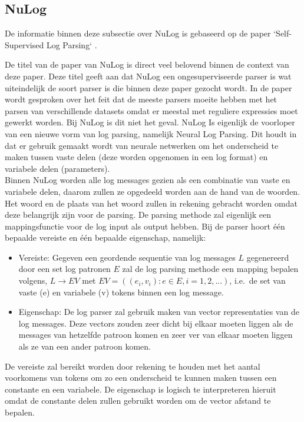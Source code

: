 \subsection{NuLog}
De informatie binnen deze subsectie over NuLog is gebaseerd op de paper `Self-Supervised Log Parsing` \autocite{SSLP2020}.

De titel van de paper van NuLog is direct veel belovend binnen de context van deze paper. Deze titel geeft aan dat NuLog een ongesuperviseerde parser is wat uiteindelijk de soort parser is die binnen deze paper gezocht wordt. In de paper wordt gesproken over het feit dat de meeste parsers moeite hebben met het parsen van verschillende datasets omdat er meestal met reguliere expressies moet gewerkt worden. Bij NuLog is dit niet het geval. NuLog Is eigenlijk de voorloper van een nieuwe vorm van log parsing, namelijk Neural Log Parsing. Dit houdt in dat er gebruik gemaakt wordt van neurale netwerken om het onderscheid te maken tussen vaste delen (deze worden opgenomen in een log format) en variabele delen (parameters).\\

Binnen NuLog worden alle log messages gezien als een combinatie van vaste en variabele delen, daarom zullen ze opgedeeld worden aan de hand van de woorden. Het woord en de plaats van het woord zullen in rekening gebracht worden omdat deze belangrijk zijn voor de parsing. De parsing methode zal eigenlijk een mappingsfunctie voor de log input als output hebben. Bij de parser hoort één bepaalde vereiste en één bepaalde eigenschap, namelijk:
\begin{itemize}
    \item Vereiste: Gegeven een geordende sequentie van log messages $L$ gegenereerd door een set log patronen $E$ zal de log parsing methode een mapping bepalen volgens, $L \longrightarrow EV$ met $EV = ((e_{i}, v_{i}): e \in E, i = 1, 2, ...)$, i.e.\ de set van vaste (e) en variabele (v) tokens binnen een log message. 
    \item Eigenschap: De log parser zal gebruik maken van vector representaties van de log messages. Deze vectors zouden zeer dicht bij elkaar moeten liggen als de messages van hetzelfde patroon komen en zeer ver van elkaar moeten liggen als ze van een ander patroon komen. 
\end{itemize}

De vereiste zal bereikt worden door rekening te houden met het aantal voorkomens van tokens om zo een onderscheid te kunnen maken tussen een constante en een variabele. De eigenschap is logisch te interpreteren hieruit omdat de constante delen zullen gebruikt worden om de vector afstand te bepalen.\\

